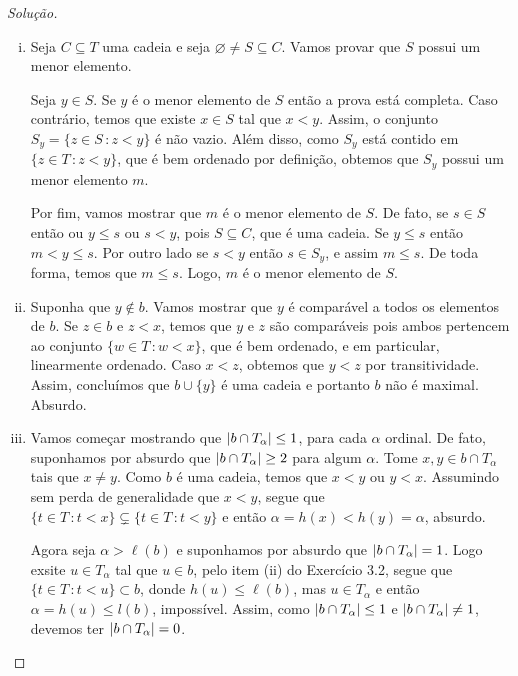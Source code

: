 \documentclass[a4paper]{article}
\begin{document}
  \begin{proof}[Solução]\hfill
    \begin{enumerate}[(i)]
      \item  Seja \(C\subseteq T\) uma cadeia e seja
        \(\varnothing\not = S\subseteq C\). Vamos provar que \(S\) possui um menor
        elemento.

        Seja \(y\in S\). Se \(y\) é o menor elemento de \(S\) então a prova está
        completa. Caso contrário, temos que existe \(x\in S\) tal que \(x<y\). Assim,
         o conjunto \(S_{y} =\{z\in S\,\colon z<y\}\) é não vazio. Além disso, como
         \(S_y\) está contido em \(\{z\in T\,\colon z<y\}\), que é bem ordenado por
         definição, obtemos que \(S_y\) possui um menor elemento \(m\).

         Por fim, vamos mostrar que \(m\) é o menor elemento de \(S\). De fato, se
         \(s\in S\) então ou \(y \leq s\) ou \(s<y\), pois \(S\subseteq C\), que é uma cadeia.
         Se \(y \leq s\) então \(m<y\leq s\). Por outro lado se
         \(s<y\) então \(s\in S_{y}\), e assim \(m\leq s\). De toda forma, temos que
         \(m\leq s\). Logo,  \(m\) é o menor elemento de \(S\).

       \item Suponha que \(y\not\in b\). Vamos mostrar que \(y\) é comparável
        a todos os elementos de \(b\). Se \(z\in b\) e \(z < x\), temos que
        \(y\) e \(z\) são comparáveis pois ambos pertencem ao conjunto \(\{w\in
        T\,\colon w< x \}\), que é bem ordenado, e em particular, linearmente
        ordenado. Caso \(x<z\), obtemos que \(y<z\) por transitividade. Assim,
        concluímos que \(b\cup\{y\}\) é uma cadeia e portanto \(b\) não é
        maximal. Absurdo.

 
        \item Vamos começar mostrando que \(\vert b \cap T_\alpha \vert \leq 1\), para cada
\(\alpha\) ordinal. De fato, suponhamos por absurdo que \(\vert b \cap T_\alpha \vert \geq
2\) para algum \(\alpha\). Tome \(x,y \in b \cap T_\alpha\) tais que \(x \neq
y\). Como \(b\) é uma cadeia, temos que \(x<y\) ou \(y<x\). Assumindo sem perda
de generalidade que \(x < y\), segue que \(\{t \in T\,\colon t < x\} \subsetneq
\{t \in T\,\colon t < y\}\) e então  \(\alpha = h(x) < h(y) = \alpha\), absurdo.

Agora seja \(\alpha > \ell(b)\) e suponhamos por absurdo que \(\vert b \cap T_\alpha \vert = 1\).
Logo exsite \(u \in T_\alpha\) tal que \(u \in b\), pelo item (ii) do Exercício
3.2, segue que \(\{t \in T\,\colon t < u\} \subset b\), donde \(h(u) \leq
\ell(b)\), mas \(u \in T_\alpha\) e então \(\alpha = h(u) \leq l(b)\), impossível.
Assim, como \(\vert b \cap T_\alpha \vert\leq 1\) e \(\vert b \cap T_\alpha \vert \not
=1\), devemos ter \(\vert b \cap T_\alpha \vert = 0\).


\end{enumerate}
\end{proof}
\end{document}
